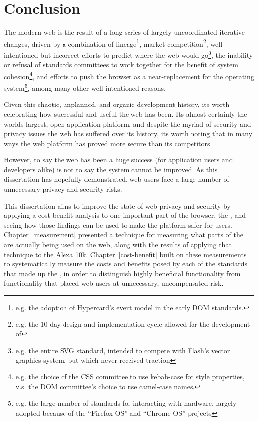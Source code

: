 \chapter{Conclusion}
\label{conclusion}

The modern web is the result of a long series of largely uncoordinated iterative
changes, driven by a combination of lineage\footnote{e.g. the
adoption of Hypercard's event model in the early DOM standards.}, market
competition\footnote{e.g. the 10-day design and implementation cycle allowed
for the development of \JS}, well-intentioned but incorrect efforts to predict
where the web would go\footnote{e.g. the entire SVG \WAPI standard, intended
to compete with Flash's vector graphics system, but which never received
traction}, the inability or refusal of standards committees to work together
for the benefit of system cohesion\footnote{e.g. the choice of the CSS committee
to use kebab-case for style properties, v.s. the DOM committee's choice to
use camel-case names.}, and efforts to push the browser as a near-replacement
for the operating system\footnote{e.g. the large number of \WAPI standards for
interacting with hardware, largely adopted because of the ``Firefox OS'' and
``Chrome OS'' projects}, among many other well intentioned reasons.

Given this chaotic, unplanned, and organic development history, its worth
celebrating how successful and useful the web has been.  Its almost certainly
the worlds largest, open application platform, and despite the myriad of
security and privacy issues the web has suffered over its history, its worth
noting that in many ways the web platform has proved more secure than its
competitors.

However, to say the web has been a huge success (for application users and
developers alike) is not to say the system cannot be improved.  As this
dissertation has hopefully demonstrated, web users face a large number of
unnecessary privacy and security risks.

This dissertation aims to improve the state of web privacy and security
by applying a cost-benefit analysis to one important part of the browser,
the \WAPI, and seeing how those findings can be used to make the platform
safer for users.  Chapter~\ref{measurement} presented a technique for measuring
what parts of the \WAPI are actually being used on the web, along with the
results of applying that technique to the Alexa 10k.  Chapter~\ref{cost-benefit}
built on these measurements to systematically measure the costs and benefits
posed by each of the standards that made up the \WAPI, in order to distinguish
highly beneficial functionality from functionality that placed web users
at unnecessary, uncompensated risk.

